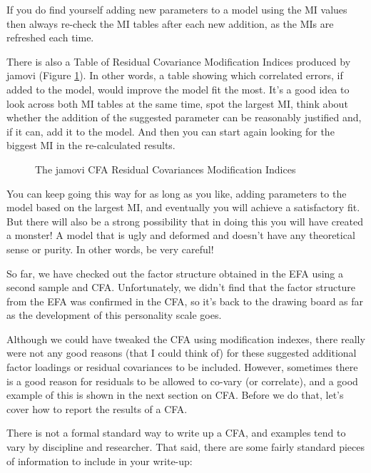 If you do find yourself adding new parameters to a model using the MI values then always re-check the MI tables after each new addition, as the MIs are refreshed each time.

There is also a Table of Residual Covariance Modification Indices produced by jamovi (Figure \ref{fig:cfa7}). In other words, a table showing which correlated errors, if added to the model, would improve the model fit the most. It's a good idea to look across both MI tables at the same time, spot the largest MI, think about whether the addition of the suggested parameter can be reasonably justified and, if it can, add it to the model. And then you can start again looking for the biggest MI in the re-calculated results. 

\begin{figure}[!htp]
\begin{center}
\caption{The jamovi CFA Residual Covariances Modification Indices}
\label{fig:cfa7}
\HR
\end{center}
\end{figure}

You can keep going this way for as long as you like, adding parameters to the model based on the largest MI, and eventually you will achieve a satisfactory fit. But there will also be a strong possibility that in doing this you will have created a monster! A model that is ugly and deformed and doesn’t have any theoretical sense or purity. In other words, be very careful!

So far, we have checked out the factor structure obtained in the EFA using a second sample and CFA. Unfortunately, we didn’t find that the factor structure from the EFA was confirmed in the CFA, so it’s back to the drawing board as far as the development of this personality scale goes. 

Although we could have tweaked the CFA using modification indexes, there really were not any good reasons (that I could think of) for these suggested additional factor loadings or residual covariances to be included. However, sometimes there is a good reason for residuals to be allowed to co-vary (or correlate), and a good example of this is shown in the next section on  CFA. Before we do that, let's cover how to report the results of a CFA.


There is not a formal standard way to write up a CFA, and examples tend to vary by discipline and researcher. That said, there are some fairly standard pieces of information to include in your write-up: 

